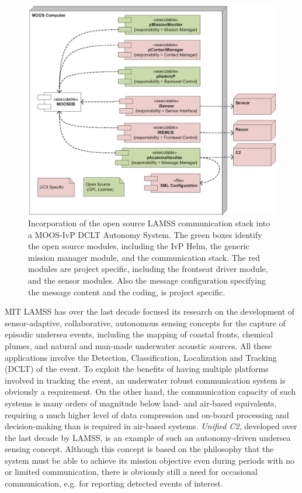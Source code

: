 \documentclass[11pt, letterpaper, oneside]{memoir}
\begin{document}
\begin{figure}[tp]
  \centering 
  \includegraphics[width=\textwidth]{dclt_component.eps}
\caption{Incorporation of the open source LAMSS communication stack into
 a MOOS-IvP DCLT Autonomy System. The green boxes identify the
 open source modules, including the IvP Helm, the generic mission
 manager module, and the communication stack. The red modules are
 project specific, including the frontseat driver module, and the
 sensor modules. Also the message configuration specifying the message
 content and the coding, is project specific. \label{lamss_dclt}} 
\end{figure}

MIT LAMSS has over the last decade focused its research on the
development of sensor-adaptive, collaborative, autonomous sensing
concepts for the capture of episodic undersea events, including the
mapping of coastal fronts, chemical plumes, and natural and man-made
underwater acoustic sources. All these applications involve the
Detection, Classification, Localization and Tracking (DCLT) of the
event. To exploit the benefits of having multiple platforms involved
in tracking the event, an underwater robust communication system is
obviously a requirement. On the other hand, the communication capacity
of such systems is many orders of magnitude below land- and air-based
equivalents, requiring a much higher level of data compression and
on-board processing and decision-making than is required in air-based
systems. {\em Unified C2}, developed over the
last decade by LAMSS, is an example of such an autonomy-driven
undersea sensing concept. Although this concept is based on the
philosophy that the system must be able to achieve its mission
objective even during periods with no or limited communication, there
is obviously still a need for occasional communication, e.g. for
reporting detected events of interest.
\end{document}
